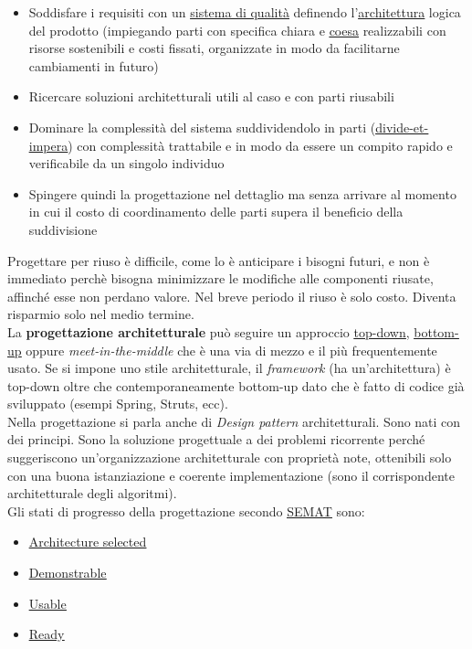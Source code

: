 		\begin{itemize}
			\item Soddisfare i requisiti con un \underline{\hyperref[sistemadiqualita]{sistema di qualità}} definendo l'\underline{\hyperref[architettura]{architettura}} logica del prodotto (impiegando parti con specifica chiara e \underline{\hyperref[coeso]{coesa}} realizzabili con risorse sostenibili e costi fissati, organizzate in modo da facilitarne cambiamenti in futuro)
			\item Ricercare soluzioni architetturali utili al caso e con parti riusabili
			\item Dominare la complessità del sistema suddividendolo in parti (\underline{\hyperref[divideetimpera]{divide-et-impera}}) con complessità trattabile e in modo da essere un compito rapido e verificabile da un singolo individuo
			\item Spingere quindi la progettazione nel dettaglio ma senza arrivare al momento in cui il costo di coordinamento delle parti supera il beneficio della suddivisione
		\end{itemize}

		Progettare per riuso è difficile, come lo è anticipare i bisogni futuri, e non è immediato perchè bisogna minimizzare le modifiche alle componenti riusate, affinché esse non perdano valore.
		Nel breve periodo il riuso è solo costo. Diventa risparmio solo nel medio termine. \\
		La \textbf{progettazione architetturale} può seguire un approccio \underline{\hyperref[topdown]{top-down}}, \underline{\hyperref[bottomup]{bottom-up}} oppure \textit{meet-in-the-middle} che è una via di mezzo e il più frequentemente usato. Se si impone uno stile architetturale, il \textit{framework} (ha un'architettura) è top-down oltre che contemporaneamente bottom-up dato che è fatto di codice già sviluppato (esempi Spring, Struts, ecc).\\
		Nella progettazione si parla anche di \textit{Design pattern} architetturali. Sono nati con dei principi. Sono la soluzione progettuale a dei problemi ricorrente perché suggeriscono un'organizzazione architetturale con proprietà note, ottenibili solo con una buona istanziazione e coerente implementazione (sono il corrispondente architetturale degli algoritmi). \\
		Gli stati di progresso della progettazione secondo \underline{\hyperref[semat]{SEMAT}} sono:
			\begin{itemize}
				\item \underline{\hyperref[architectureselected]{Architecture selected}}
				\item \underline{\hyperref[demonstrable]{Demonstrable}}
				\item \underline{\hyperref[usable]{Usable}}
				\item \underline{\hyperref[ready]{Ready}}
			\end{itemize}

